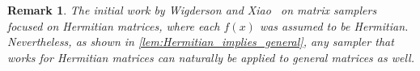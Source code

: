 \documentclass[11pt,letterpaper]{article}
\newtheorem{remark}[theorem]{Remark}
\newcommand{\C}{\mathbb{C}}
\DeclareMathOperator*{\E}{\mathbb{E}}
\newcommand{\eps}{\varepsilon}
\newcommand{\1}{\mathbbm{1}}
\newcommand{\norm}[1]{\left\lVert #1\right\rVert}
\newcommand{\abs}[1]{\left|#1\right| }
\newcommand{\tuple}[1]{\left(#1\right)}
\newcommand{\zo}{\{0, 1\}}
\newcommand{\Smp}{\textup{\textsf{Samp}}}
\newcommand{\Prb}[2][]{ \ifthenelse{\isempty{#1}}
  {\Pr\left[#2\right]}
  {\Pr_{#1}\left[#2\right]} }
\begin{document}

\begin{remark}
    The initial work by Wigderson and Xiao~\cite{WX05} on matrix samplers focused on Hermitian matrices, where each $f(x)$ was assumed to be Hermitian. Nevertheless, as shown in \cref{lem:Hermitian_implies_general}, any sampler that works for Hermitian matrices can naturally be applied to general matrices as well.
\end{remark}
\end{document}
